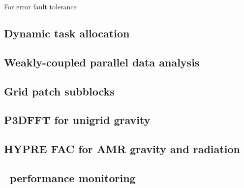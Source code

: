 \documentclass{article}
\begin{document}
   For error fault tolerance

\subsection{Dynamic task allocation} \label{solution:parallel-dynamic-tasks}
\subsection{Weakly-coupled parallel data analysis}\label{solution:parallel-data-analysis}
\subsection{Grid patch subblocks} \label{solution:parallel-subblocks}

\subsection{P3DFFT for unigrid gravity} \label{solution:method-p3dfft}

\subsection{HYPRE FAC for AMR gravity and radiation}  \label{solution:method-hypre-fac}
\subsection{\lcaperf\ performance monitoring} \label{solution:performance-lcaperf}
\end{document}
